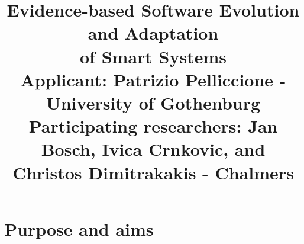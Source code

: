 \documentclass[12pt]{article}
\date{}
\begin{document}
\title{\vspace{-2cm}Evidence-based Software Evolution and Adaptation \\of Smart Systems\\ \vspace{.2cm} {\normalsize {\bf Applicant}: Patrizio Pelliccione - University of Gothenburg}\\ \vspace{-.2cm} {\normalsize {\bf Participating researchers}: Jan Bosch, Ivica Crnkovic, and Christos Dimitrakakis - Chalmers}}

\renewcommand{\footskip}{20pt}
 
\newcommand{\name}{{\tt EVO\&ADA}} 

\maketitle

\vspace{-2cm}

\section{Purpose and aims}\label{sec:purpose}
\vspace{-.4cm}
 
\end{document}
